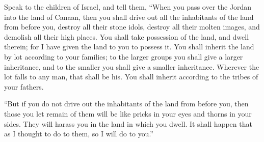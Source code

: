 {Speak to the children of Israel, and tell them, “When you pass over the Jordan into the land of Canaan,
then you shall drive out all the inhabitants of the land from before you, destroy all their stone idols, destroy all their molten images, and demolish all their high places.
You shall take possession of the land, and dwell therein; for I have given the land to you to possess it.
You shall inherit the land by lot according to your families; to the larger groups you shall give a larger inheritance, and to the smaller you shall give a smaller inheritance. Wherever the lot falls to any man, that shall be his. You shall inherit according to the tribes of your fathers.
\par }{\PP {}“But if you do not drive out the inhabitants of the land from before you, then those you let remain of them will be like pricks in your eyes and thorns in your sides. They will harass you in the land in which you dwell.
It shall happen that as I thought to do to them, so I will do to you.”

}
